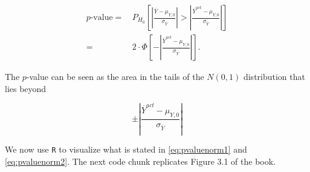 \documentclass[]{book}
\theoremstyle{definition}
\theoremstyle{definition}
\theoremstyle{definition}
\theoremstyle{remark}
\begin{document}
\begin{align}
p \text{-value} =& \, P_{H_0}\left[ \left\lvert \frac{\overline{Y} - \mu_{Y,0}}{\sigma_{\overline{Y}}} \right\rvert > \left\lvert \frac{\overline{Y}^{act} - \mu_{Y,0}}{\sigma_{\overline{Y}}} \right\rvert \right] \\
=& \, 2 \cdot \Phi \left[ - \left\lvert \frac{\overline{Y}^{act} - \mu_{Y,0}}{\sigma_{\overline{Y}}}  \right\rvert\right].  \label{eq:pvaluenorm1}
\end{align}

The \(p\)-value can be seen as the area in the tails of the \(N(0,1)\)
distribution that lies beyond

\begin{equation}
\pm \left\lvert \frac{\overline{Y}^{act} - \mu_{Y,0}}{\sigma_{\overline{Y}}} \right\rvert \label{eq:pvaluenorm2}
\end{equation}

We now use \texttt{R} to visualize what is stated in
\eqref{eq:pvaluenorm1} and \eqref{eq:pvaluenorm2}. The next code chunk
replicates Figure 3.1 of the book.
\end{document}
